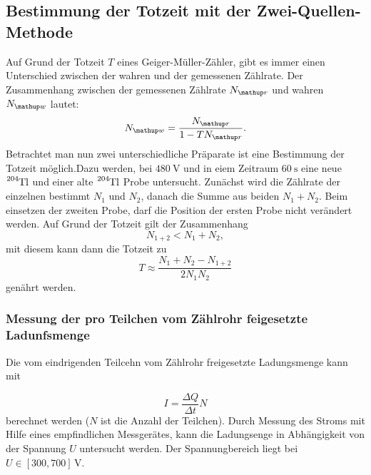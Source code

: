 \subsection{Bestimmung der Totzeit mit der Zwei-Quellen-Methode}
Auf Grund der Totzeit $T$ eines Geiger-Müller-Zähler, gibt es immer einen
Unterschied zwischen der wahren und der gemessenen Zählrate.
Der Zusammenhang zwischen der gemessenen Zählrate $N\ua{r}$ und
wahren $N\ua{w}$ lautet:
\begin{equation}
  \label{eq:wahre_zaehlrate}
  N\ua{w}=\frac{N\ua{r}}{1-TN\ua{r}}.
\end{equation}
Betrachtet man nun zwei unterschiedliche Präparate ist eine
Bestimmung der Totzeit möglich.Dazu werden, bei $\SI{480}{\volt}$ und in eiem Zeitraum $\SI{60}{\second}$ eine neue
$\ce{^{204}Tl}$ und einer alte $\ce{^{204}Tl}$ Probe untersucht.
Zunächst wird die Zählrate der einzelnen bestimmt $N_1$ und $N_2$, danach die
Summe aus beiden $N_1+N_2$. Beim einsetzen der zweiten Probe, darf die Position der
ersten Probe nicht verändert werden.
Auf Grund der Totzeit gilt der Zusammenhang
\begin{equation}
  \label{eq:totzeit_summe}
  N_{1+2}<N_1+N_2,
\end{equation}
mit diesem kann dann die Totzeit zu
\begin{equation}
  \label{eq:totzeit}
  T\approx \frac{N_1+N_2-N_{1+2}}{2N_1N_2}
\end{equation}
genährt werden.

\subsubsection{Messung der pro Teilchen vom Zählrohr feigesetzte Ladunfsmenge}
Die vom eindrigenden Teilcehn vom Zählrohr freigesetzte Ladungsmenge kann mit

\begin{equation}
  \label{eq:lafung_pro_teilchen}
  I=\frac{\Delta Q}{\Delta t} N
\end{equation}
berechnet werden ($N$ ist die Anzahl der Teilchen).
Durch Messung des Stroms mit Hilfe eines empfindlichen Messgerätes,
kann die Ladungsenge in Abhängigkeit von der Spannung $U$ untersucht werden.
Der Spannungbereich liegt bei $U\in\left[300, 700\right] \, \si{\volt}$.
